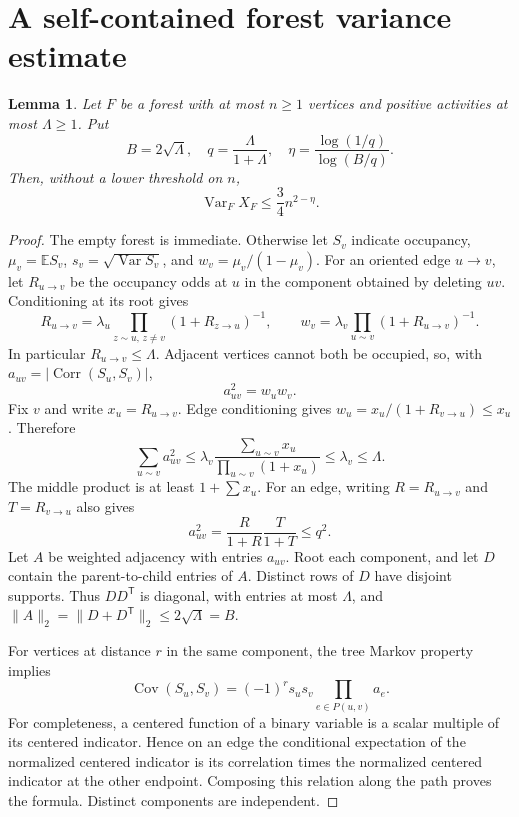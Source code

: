 \documentclass[10pt]{article}
\newtheorem{lemma}[theorem]{Lemma}
\newcommand{\Var}{\operatorname{Var}}
\begin{document}
\section{A self-contained forest variance estimate}
\begin{lemma}\label{lem:forest}
Let \(F\) be a forest with at most \(n\ge1\) vertices and positive
activities at most \(\Lambda\ge1\). Put
\[
 B=2\sqrt\Lambda,\quad q=\frac{\Lambda}{1+\Lambda},\quad
 \eta=\frac{\log(1/q)}{\log(B/q)}.
\]
Then, without a lower threshold on \(n\),
\begin{equation}\label{eq:variance}
 \Var_F X_F\le\frac34 n^{2-\eta}.
\end{equation}
\end{lemma}
\begin{proof}
The empty forest is immediate. Otherwise let \(S_v\) indicate occupancy,
\(\mu_v=\mathbb E S_v\), \(s_v=\sqrt{\Var S_v}\), and
\(w_v=\mu_v/(1-\mu_v)\). For an oriented edge \(u\to v\), let
\(R_{u\to v}\) be the occupancy odds at \(u\) in the component obtained
by deleting \(uv\). Conditioning at its root gives
\[
 R_{u\to v}=\lambda_u\prod_{z\sim u,\,z\ne v}(1+R_{z\to u})^{-1},
 \qquad w_v=\lambda_v\prod_{u\sim v}(1+R_{u\to v})^{-1}.
\]
In particular \(R_{u\to v}\le\Lambda\). Adjacent vertices cannot both
be occupied, so, with \(a_{uv}=|\operatorname{Corr}(S_u,S_v)|\),
\[
 a_{uv}^2=w_uw_v.
\]
Fix \(v\) and write \(x_u=R_{u\to v}\). Edge conditioning gives
\(w_u=x_u/(1+R_{v\to u})\le x_u\). Therefore
\[
 \sum_{u\sim v}a_{uv}^2
 \le\lambda_v\frac{\sum_{u\sim v}x_u}{\prod_{u\sim v}(1+x_u)}
 \le\lambda_v\le\Lambda.
\]
The middle product is at least \(1+\sum x_u\). For an edge, writing
\(R=R_{u\to v}\) and \(T=R_{v\to u}\) also gives
\[
 a_{uv}^2=\frac{R}{1+R}\frac{T}{1+T}\le q^2.
\]
Let \(A\) be weighted adjacency with entries \(a_{uv}\). Root each
component, and let \(D\) contain the parent-to-child entries of \(A\).
Distinct rows of \(D\) have disjoint supports. Thus \(DD^\mathsf T\)
is diagonal, with entries at most \(\Lambda\), and
\(\|A\|_2=\|D+D^\mathsf T\|_2\le2\sqrt\Lambda=B\).

For vertices at distance \(r\) in the same component, the tree Markov
property implies
\[
 \operatorname{Cov}(S_u,S_v)=(-1)^r s_us_v
                  \prod_{e\in P(u,v)}a_e.
\]
For completeness, a centered function of a binary variable is a scalar
multiple of its centered indicator. Hence on an edge the conditional
expectation of the normalized centered indicator is its correlation
times the normalized centered indicator at the other endpoint.
Composing this relation along the path proves the formula. Distinct
components are independent.


\end{proof}
\end{document}
